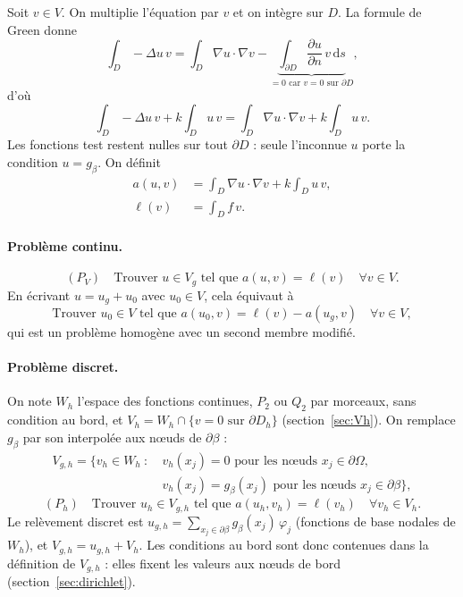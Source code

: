 \documentclass[11pt,a4paper]{article}
\begin{document}
Soit $v \in V$. On multiplie l'équation par $v$ et
on intègre sur $D$. La formule de Green donne
\[
\int_D -\Delta u \, v
= \int_D \nabla u \cdot \nabla v
- \underbrace{\int_{\partial D} \frac{\partial u}{\partial n}\, v \,\mathrm{d}s}_{=0 \text{ car } v = 0 \text{ sur } \partial D} ,
\]
d'où
\[
\int_D -\Delta u \, v + k \int_D u\, v
= \int_D \nabla u \cdot \nabla v + k \int_D u\, v .
\]
Les fonctions test restent nulles sur tout $\partial D$ : seule l'inconnue
$u$ porte la condition $u = g_\beta$. On définit
\begin{align*}
a(u, v) &= \int_D \nabla u \cdot \nabla v + k \int_D u\, v,\\
\ell(v) &= \int_D f\, v.
\end{align*}

\paragraph{Problème continu.}
\[
(P_V)\quad \text{Trouver } u \in V_g \text{ tel que } a(u, v) = \ell(v)
\quad \forall v \in V .
\]
En écrivant $u = u_g + u_0$ avec $u_0 \in V$, cela équivaut à
\[
\text{Trouver } u_0 \in V \text{ tel que }
a(u_0, v) = \ell(v) - a(u_g, v) \quad \forall v \in V ,
\]
qui est un problème homogène avec un second membre modifié.

\paragraph{Problème discret.} On note $W_h$ l'espace des fonctions
continues, $P_2$ ou $Q_2$ par morceaux, sans condition au bord, et
$V_h = W_h \cap \{ v = 0 \text{ sur } \partial D_h \}$
(section~\ref{sec:Vh}). On remplace $g_\beta$ par son interpolée aux nœuds
de $\partial\beta$ :
\[
\begin{aligned}
V_{g,h} = \big\{ v_h \in W_h \ :\ & v_h(x_j) = 0 \text{ pour les nœuds } x_j \in \partial\Omega,\\
& v_h(x_j) = g_\beta(x_j) \text{ pour les nœuds } x_j \in \partial\beta \big\},
\end{aligned}
\]
\[
(P_h)\quad \text{Trouver } u_h \in V_{g,h} \text{ tel que } a(u_h, v_h) = \ell(v_h)
\quad \forall v_h \in V_h .
\]
Le relèvement discret est $u_{g,h} = \sum_{x_j \in \partial\beta}
g_\beta(x_j)\, \varphi_j$ (fonctions de base nodales de $W_h$), et
$V_{g,h} = u_{g,h} + V_h$. Les conditions au bord sont donc contenues
dans la définition de $V_{g,h}$ : elles fixent les valeurs aux nœuds de
bord (section~\ref{sec:dirichlet}).
\end{document}

